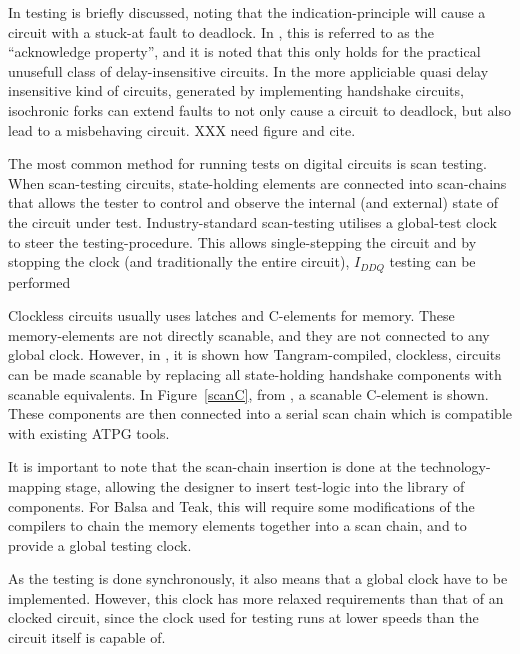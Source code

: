 In \cite[pp. 27-28]{sparso} testing is briefly discussed, noting that
the indication-principle will cause a circuit with a stuck-at fault to
deadlock. In \cite[pp. 26]{fullscan}, this is referred to as the
``acknowledge property'', and it is noted that this only holds for the
practical unusefull class of delay-insensitive circuits. In the more
appliciable quasi delay insensitive kind of circuits, generated by
implementing handshake circuits, isochronic forks can extend faults to
not only cause a circuit to deadlock, but also lead to a misbehaving
circuit. XXX need figure and cite.

The most common method for running tests on digital circuits is
scan testing. When scan-testing circuits, state-holding elements are
connected into scan-chains that allows the tester to control and
observe the internal (and external) state of the circuit under
test. Industry-standard scan-testing utilises a global-test clock to
steer the testing-procedure. This allows single-stepping the circuit
and by stopping the clock (and traditionally the entire circuit),
$I_{DDQ}$ testing can be performed

Clockless circuits usually uses latches and C-elements for
memory. These memory-elements are not directly scanable, and they are
not connected to any global clock. However, in \cite{fullscan}, it is
shown how Tangram-compiled, clockless, circuits can be made scanable
by replacing all state-holding handshake components with scanable
equivalents. In Figure~\ref{scanC}, from \cite{fullscan}, a scanable
C-element is shown. These components are then connected into a serial
scan chain which is compatible with existing ATPG tools.

It is important to note that the scan-chain insertion is done at the
technology-mapping stage, allowing the designer to insert test-logic
into the library of components. For Balsa and Teak, this will require
some modifications of the compilers to chain the memory elements
together into a scan chain, and to provide a global testing clock.

As the testing is done synchronously, it also means that a global
clock have to be implemented. However, this clock has more relaxed
requirements than that of an clocked circuit, since the clock used for
testing runs at lower speeds than the circuit itself is capable of.

